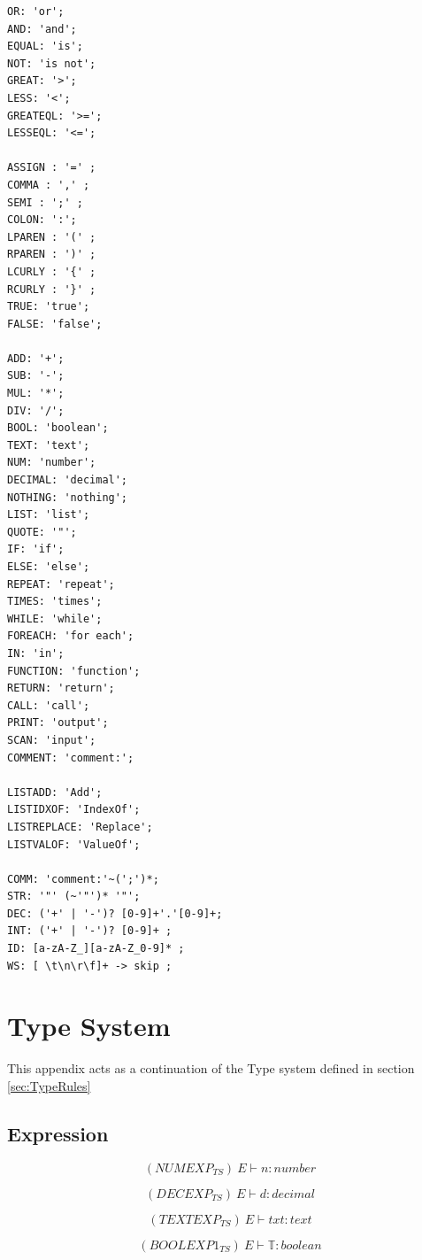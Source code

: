 \begin{lstlisting}[label={list:ANTLR LEXER},caption=Lexer for \lang used in the ANTLR CFG]
OR: 'or'; 
AND: 'and'; 
EQUAL: 'is'; 
NOT: 'is not'; 
GREAT: '>'; 
LESS: '<'; 
GREATEQL: '>='; 
LESSEQL: '<='; 

ASSIGN : '=' ; 
COMMA : ',' ; 
SEMI : ';' ;
COLON: ':';
LPAREN : '(' ; 
RPAREN : ')' ; 
LCURLY : '{' ; 
RCURLY : '}' ; 
TRUE: 'true'; 
FALSE: 'false';

ADD: '+'; 
SUB: '-'; 
MUL: '*'; 
DIV: '/'; 
BOOL: 'boolean'; 
TEXT: 'text'; 
NUM: 'number';
DECIMAL: 'decimal';
NOTHING: 'nothing';
LIST: 'list';
QUOTE: '"'; 
IF: 'if'; 
ELSE: 'else';
REPEAT: 'repeat';
TIMES: 'times';
WHILE: 'while';
FOREACH: 'for each';
IN: 'in';
FUNCTION: 'function';
RETURN: 'return';
CALL: 'call';
PRINT: 'output';
SCAN: 'input';
COMMENT: 'comment:';

LISTADD: 'Add';
LISTIDXOF: 'IndexOf';
LISTREPLACE: 'Replace';
LISTVALOF: 'ValueOf';

COMM: 'comment:'~(';')*;
STR: '"' (~'"')* '"';
DEC: ('+' | '-')? [0-9]+'.'[0-9]+; 
INT: ('+' | '-')? [0-9]+ ;
ID: [a-zA-Z_][a-zA-Z_0-9]* ; 
WS: [ \t\n\r\f]+ -> skip ; 
\end{lstlisting}

\chapter{Type System} \label{Appendix:TypeSystem}

This appendix acts as a continuation of the Type system defined in section \ref{sec:TypeRules} \\

\section{Expression} \label{Appendix:Typesystem:Eq}

\begin{equation}
    (NUMEXP_{TS}) \ E\vdash n: number
\end{equation}

\begin{equation}
    (DECEXP_{TS}) \ E\vdash d: decimal
\end{equation}

\begin{equation}
    (TEXTEXP_{TS}) \ E\vdash txt: text
\end{equation}

\begin{equation}
    (BOOLEXP1_{TS}) \ E\vdash \mathbb{T} : boolean
\end{equation}

